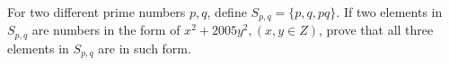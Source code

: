 For two different prime numbers $p, q$, define $S_{p,q} = \{p,q,pq\}$. If two elements in $S_{p,q}$  are numbers in the form of $x^2 + 2005y^2, (x, y \in Z)$, prove that all three elements in $S_{p,q}$ are in such form.